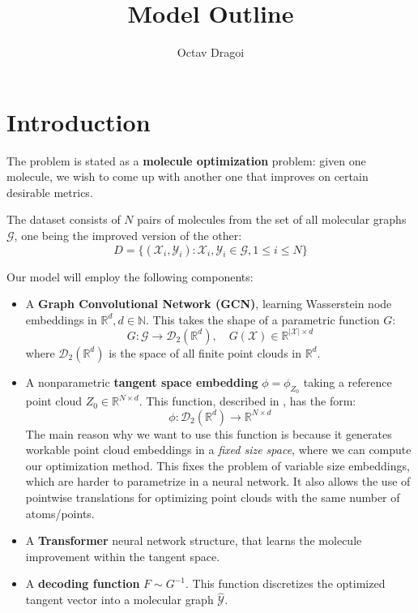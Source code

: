 \documentclass{article}
\begin{document}
\title{Model Outline}
\author{Octav Dragoi}

\maketitle

\section{Introduction}

The problem is stated as a \textbf{molecule optimization} problem: given one molecule, we wish to come up with another one that improves on certain desirable metrics.

The dataset consists of $N$ pairs of molecules from the set of all molecular graphs $\mathcal{G}$, one being the improved version of the other:
\begin{equation}
    \label{eq:problem_setup}
    D = \{(\mathcal{X}_i, \mathcal{Y}_i) : \mathcal{X}_i, \mathcal{Y}_i\in \mathcal{G}, 1\leq i\leq N\}
\end{equation}

Our model will employ the following components:
\begin{itemize}
    \item A \textbf{Graph Convolutional Network (GCN)}, learning Wasserstein node embeddings in $\mathbb{R}^d, d\in \mathbb{N}$. This takes the shape of a parametric function $G$:
    \[G:\mathcal{G} \rightarrow \mathscr{D}_2({\mathbb{R}^d}),\quad G(\mathcal{X})\in \mathbb{R}^{|\mathcal{X}|\times d} \] 
    where $\mathscr{D}_2({\mathbb{R}^d})$ is the space of all finite point clouds in $\mathbb{R}^d$.
    \item A nonparametric \textbf{tangent space embedding} $\phi = \phi_{Z_0}$ taking a reference point cloud $Z_0\in \mathbb{R}^{N\times d}$. This function, described in \cite{kolouri2020wasserstein}, has the form:
    \[\phi : \mathscr{D}_2({\mathbb{R}^d}) \rightarrow \mathbb{R}^{N\times d}\]
    The main reason why we want to use this function is because it generates workable point cloud embeddings in a \textit{fixed size space}, where we can compute our optimization method. This fixes the problem of variable size embeddings, which are harder to parametrize in a neural network. It also allows the use of pointwise translations for optimizing point clouds with the same number of atoms/points.
    \item A \textbf{Transformer} neural network structure, that learns the molecule improvement within the tangent space.
    \item A \textbf{decoding function} $F\sim G^{-1}$. This function discretizes the optimized tangent vector into a molecular graph $\hat{\mathcal{Y}}$.
\end{itemize}
\end{document}
